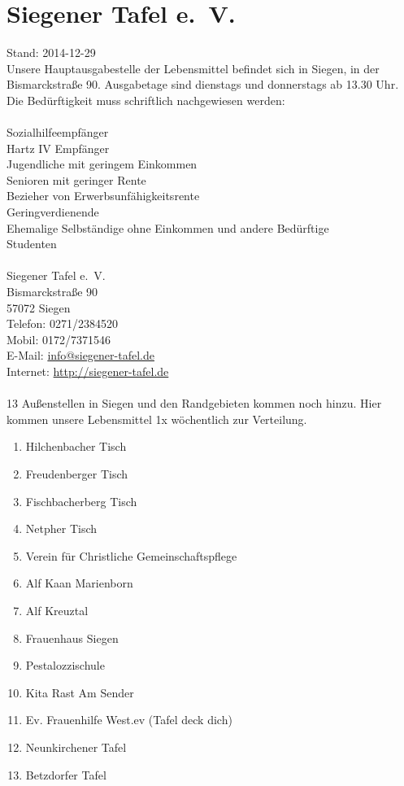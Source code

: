 \documentclass[11pt,fleqn]{book} %
\begin{document}
\section{Siegener Tafel e.~V.}   
Stand: 2014-12-29\\
Unsere Hauptausgabestelle der Lebensmittel befindet sich in Siegen, in der Bismarckstraße 90. Ausgabetage sind dienstags und donnerstags ab 13.30 Uhr. Die Bedürftigkeit muss schriftlich nachgewiesen werden:\\
\\
Sozialhilfeempfänger\\
Hartz IV Empfänger\\
Jugendliche mit geringem Einkommen\\
Senioren mit geringer Rente\\
Bezieher von Erwerbsunfähigkeitsrente\\
Geringverdienende\\
Ehemalige Selbständige ohne Einkommen und andere Bedürftige\\
Studenten\\
\\
Siegener Tafel e.~V.\\
Bismarckstraße 90\\
57072 Siegen\\
Telefon: 0271/2384520\\
Mobil: 0172/7371546\\
E-Mail: \href{mailto:info@siegener-tafel.de}{info@siegener-tafel.de}\\
Internet: \href{http://siegener-tafel.de}{http://siegener-tafel.de}\\
\\
13 Außenstellen in Siegen und den Randgebieten kommen noch hinzu. Hier kommen unsere Lebensmittel 1x wöchentlich zur Verteilung. 
\begin{enumerate}
	\item Hilchenbacher Tisch
	\item Freudenberger Tisch
	\item Fischbacherberg Tisch
	\item Netpher Tisch
	\item Verein für Christliche Gemeinschaftspflege
	\item Alf Kaan Marienborn
	\item Alf Kreuztal
	\item Frauenhaus Siegen
	\item Pestalozzischule
	\item Kita Rast Am Sender
	\item Ev. Frauenhilfe West.ev (Tafel deck dich)
	\item Neunkirchener Tafel
	\item Betzdorfer Tafel 
\end{enumerate}
\end{document}
